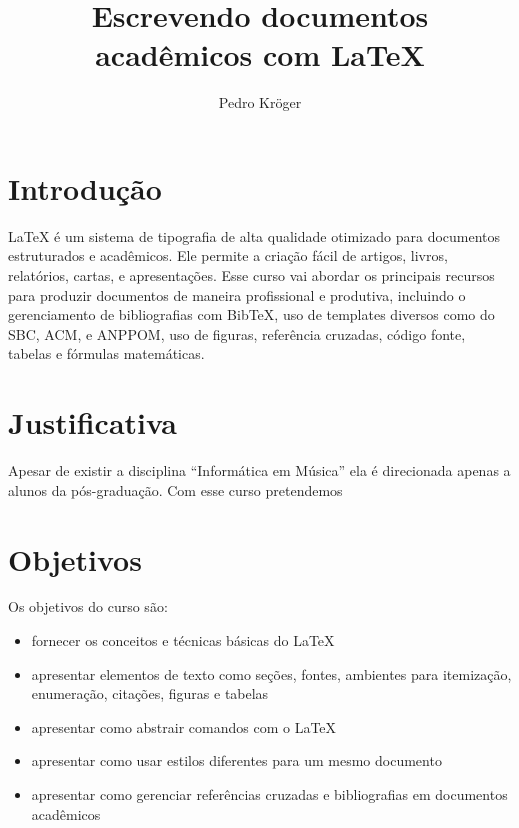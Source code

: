 \documentclass[12pt,brazil]{article}
\begin{document}

\title{Escrevendo documentos acadêmicos com \LaTeX}
\author{Pedro Kröger}
\maketitle

\thispagestyle{empty}

\section{Introdução}

LaTeX é um sistema de tipografia de alta qualidade otimizado para
documentos estruturados e acadêmicos. Ele permite a criação fácil de
artigos, livros, relatórios, cartas, e apresentações. Esse curso vai
abordar os principais recursos para produzir documentos de maneira
profissional e produtiva, incluindo o gerenciamento de bibliografias
com BibTeX, uso de templates diversos como do SBC, ACM, e ANPPOM, uso
de figuras, referência cruzadas, código fonte, tabelas e fórmulas
matemáticas.

\section{Justificativa}

Apesar de existir a disciplina ``Informática em Música'' ela é
direcionada apenas a alunos da pós-graduação. Com esse curso
pretendemos 

\section{Objetivos}

Os objetivos do curso são:

\begin{itemize}
\item fornecer os conceitos e técnicas básicas do \LaTeX
\item apresentar elementos de texto como seções, fontes, ambientes
  para itemização, enumeração, citações, figuras e tabelas
\item apresentar como abstrair comandos com o \LaTeX
\item apresentar como usar estilos diferentes para um mesmo documento
\item apresentar como gerenciar referências cruzadas e bibliografias
  em documentos acadêmicos
\end{itemize}
\end{document}
